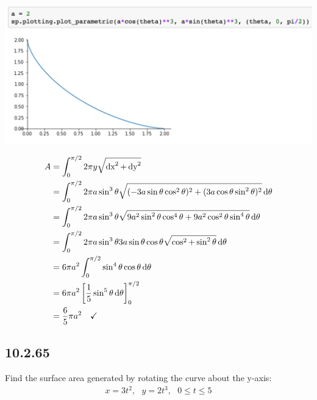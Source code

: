\documentclass[12pt]{article}
\begin{document}
\includegraphics[width=500pt]{img/10-2-63.png}

\begin{mdframed}
  \begin{align*}
    A &= \int_0^{\pi/2} 2\pi y \sqrt{\operatorname{\text{dx}}^2 + \operatorname{\text{dy}}^2}\\
      &= \int_0^{\pi/2} 2\pi a\sin^3\theta \sqrt{(-3a\sin\theta\cos^2\theta)^2 +
                                                (3a\cos\theta\sin^2\theta)^2} \operatorname{\text{d}\theta}\\
      &= \int_0^{\pi/2} 2\pi a\sin^3\theta \sqrt{9a^2\sin^2\theta\cos^4\theta +
                                                9a^2\cos^2\theta\sin^4\theta} \operatorname{\text{d}\theta}\\
      &= \int_0^{\pi/2} 2\pi a\sin^3\theta 3a\sin\theta\cos\theta \sqrt{\cos^2 + \sin^2\theta} \operatorname{\text{d}\theta}\\
      &= 6\pi a^2\int_0^{\pi/2} \sin^4\theta \cos\theta \operatorname{\text{d}\theta}\\
      &= 6\pi a^2 \left[\frac{1}{5}\sin^5\theta \operatorname{\text{d}\theta} \right]_0^{\pi/2}\\
      &= \frac{6}{5}\pi a^2  ~~~ \checkmark
  \end{align*}
\end{mdframed}

\newpage
\subsection*{10.2.65}
Find the surface area generated by rotating the curve about the y-axis:
\begin{align*}
  x = 3t^2, ~~~ y = 2t^3, ~~~ 0 \leq t \leq 5
\end{align*}
\end{document}
